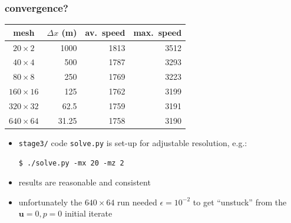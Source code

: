 \documentclass[10pt,hyperref,dvipsnames]{beamer}
\newcommand{\bu}{\mathbf{u}}
\newcommand{\eps}{\epsilon}
\begin{document}
\begin{frame}[fragile]
\frametitle{convergence?}

\begin{center}
\begin{tabular}{c|rrr}
mesh           &   $\Delta x$ (m) & av.~speed & max.~speed \\ \hline
$20\times 2$   &             1000 &      1813 &       3512 \\
$40\times 4$   &              500 &      1787 &       3293 \\
$80\times 8$   &              250 &      1769 &       3223 \\
$160\times 16$ &              125 &      1762 &       3199 \\
$320\times 32$ &             62.5 &      1759 &       3191 \\
$640\times 64$ &            31.25 &      1758 &       3190
\end{tabular}
\end{center}

\begin{itemize}
\item \texttt{stage3/} code \texttt{solve.py} is set-up for adjustable resolution, e.g.:
\begin{Verbatim}
$ ./solve.py -mx 20 -mz 2
\end{Verbatim}
\item results are reasonable and consistent
\item unfortunately the $640\times 64$ run needed $\eps=10^{-2}$ to get ``unstuck'' from the $\bu=0,p=0$ initial iterate
\end{itemize}
\end{frame}
\end{document}
